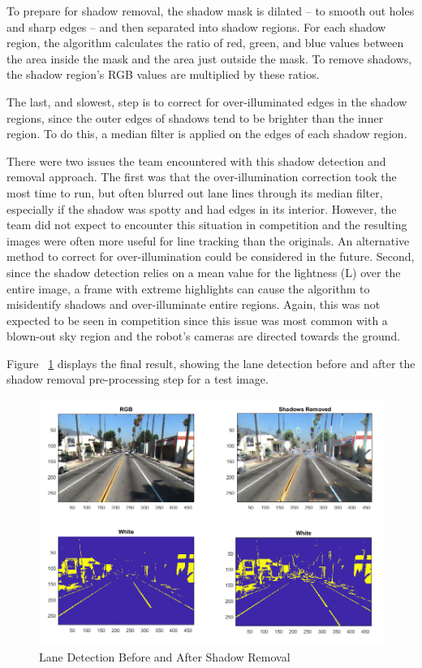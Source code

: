 \documentclass[11pt,journal]{IEEEtran}
\begin{document}
To prepare for shadow removal, the shadow mask is dilated – to smooth out holes and sharp edges – and then separated into shadow regions. For each shadow region, the algorithm calculates the ratio of red, green, and blue values between the area inside the mask and the area just outside the mask. To remove shadows, the shadow region's RGB values are multiplied by these ratios.

The last, and slowest, step is to correct for over-illuminated edges in the shadow regions, since the outer edges of shadows tend to be brighter than the inner region. To do this, a median filter is applied on the edges of each shadow region.

There were two issues the team encountered with this shadow detection and removal approach. The first was that the over-illumination correction took the most time to run, but often blurred out lane lines through its median filter, especially if the shadow was spotty and had edges in its interior. However, the team did not expect to encounter this situation in competition and the resulting images were often more useful for line tracking than the originals. An alternative method to correct for over-illumination could be considered in the future. Second, since the shadow detection relies on a mean value for the lightness (L) over the entire image, a frame with extreme highlights can cause the algorithm to misidentify shadows and over-illuminate entire regions. Again, this was not expected to be seen in competition since this issue was most common with a blown-out sky region and the robot's cameras are directed towards the ground.

Figure ~\ref{Shadow6} displays the final result, showing the lane detection before and after the shadow removal pre-processing step for a test image.

\begin{figure}[ht]
\centerline{\includegraphics[width=0.9\columnwidth]{X6.png}}
\caption{Lane Detection Before and After Shadow Removal}
\label{Shadow6}
\end{figure}
\end{document}
